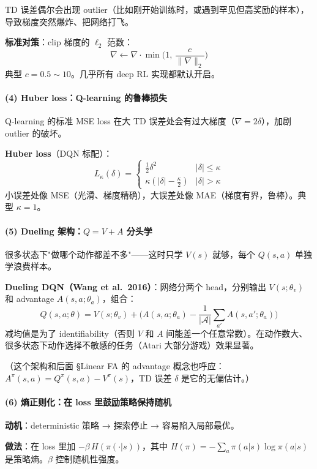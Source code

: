 \documentclass[11pt,a4paper]{article}
\theoremstyle{definition}
\begin{document}
TD 误差偶尔会出现 outlier（比如刚开始训练时，或遇到罕见但高奖励的样本），导致梯度突然爆炸、把网络打飞。

\textbf{标准对策}：clip 梯度的 $\ell_2$ 范数：
\[
\nabla \leftarrow \nabla \cdot \min\Big(1,\, \frac{c}{\|\nabla\|_2}\Big)
\]
典型 $c = 0.5 \sim 10$。几乎所有 deep RL 实现都默认开启。

\paragraph{(4) Huber loss：Q-learning 的鲁棒损失}

Q-learning 的标准 MSE loss 在大 TD 误差处会有过大梯度（$\nabla = 2 \delta$），加剧 outlier 的破坏。

\textbf{Huber loss}（DQN 标配）：
\[
L_\kappa(\delta) = \begin{cases} \tfrac{1}{2}\delta^2 & |\delta| \le \kappa \\ \kappa(|\delta| - \tfrac{\kappa}{2}) & |\delta| > \kappa \end{cases}
\]
小误差处像 MSE（光滑、梯度精确），大误差处像 MAE（梯度有界，鲁棒）。典型 $\kappa = 1$。

\paragraph{(5) Dueling 架构：$Q = V + A$ 分头学}

很多状态下"做哪个动作都差不多"——这时只学 $V(s)$ 就够，每个 $Q(s, a)$ 单独学浪费样本。

\textbf{Dueling DQN（Wang et al.\ 2016）}：网络分两个 head，分别输出 $V(s; \theta_v)$ 和 advantage $A(s, a; \theta_a)$，组合：
\[
Q(s, a; \theta) = V(s; \theta_v) + \Big(A(s, a; \theta_a) - \frac{1}{|\mathcal{A}|}\sum_{a'} A(s, a'; \theta_a)\Big)
\]
减均值是为了 identifiability（否则 $V$ 和 $A$ 间能差一个任意常数）。在动作数大、很多状态下动作选择不敏感的任务（Atari 大部分游戏）效果显著。

（这个架构和后面 §Linear FA 的 advantage 概念也呼应：$A^\pi(s,a) = Q^\pi(s,a) - V^\pi(s)$，TD 误差 $\delta$ 是它的无偏估计。）

\paragraph{(6) 熵正则化：在 loss 里鼓励策略保持随机}

\textbf{动机}：deterministic 策略 → 探索停止 → 容易陷入局部最优。

\textbf{做法}：在 loss 里加 $-\beta\, H(\pi(\cdot|s))$，其中 $H(\pi) = -\sum_a \pi(a|s)\log\pi(a|s)$ 是策略熵。$\beta$ 控制随机性强度。
\end{document}

